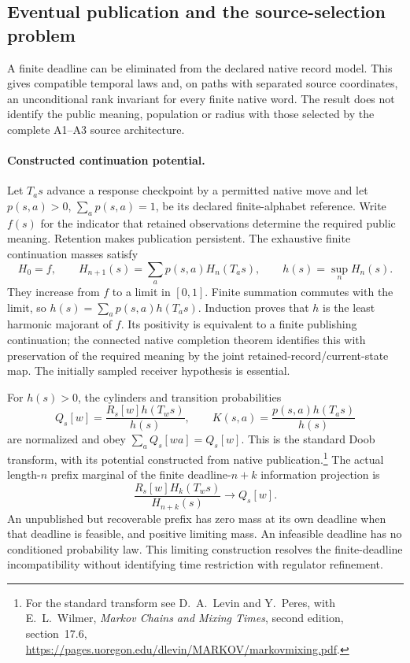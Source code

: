 \subsection{Eventual publication and the source-selection problem}
\label{sec:source-eventual-publication}

A finite deadline can be eliminated from the declared native record model.
This gives compatible temporal laws and, on paths with separated source
coordinates, an unconditional rank invariant for every finite native word.
The result does not identify the public meaning, population or radius with
those selected by the complete A1--A3 source architecture.

\paragraph{Constructed continuation potential.}
Let $T_a s$ advance a response checkpoint by a permitted native move and
let $p(s,a)>0$, $\sum_a p(s,a)=1$, be its declared finite-alphabet reference.
Write $f(s)$ for the indicator that retained observations determine the
required public meaning. Retention makes publication persistent. The
exhaustive finite continuation masses satisfy
\[
 H_0=f,\qquad H_{n+1}(s)=\sum_a p(s,a)H_n(T_a s),\qquad
 h(s)=\sup_n H_n(s).
\]
They increase from $f$ to a limit in $[0,1]$. Finite summation commutes
with the limit, so $h(s)=\sum_a p(s,a)h(T_a s)$. Induction proves that
$h$ is the least harmonic majorant of $f$. Its positivity is equivalent
to a finite publishing continuation; the connected native completion
theorem identifies this with preservation of the required meaning by
the joint retained-record/current-state map. The initially sampled
receiver hypothesis is essential.

For $h(s)>0$, the cylinders and transition probabilities
\[
 Q_s[w]=\frac{R_s[w]h(T_w s)}{h(s)},\qquad
 K(s,a)=\frac{p(s,a)h(T_a s)}{h(s)}
\]
are normalized and obey $\sum_a Q_s[wa]=Q_s[w]$. This is the standard
Doob transform, with its potential constructed from native publication.\footnote{
For the standard transform see D.~A.~Levin and Y.~Peres, with E.~L.~Wilmer,
\emph{Markov Chains and Mixing Times}, second edition, section~17.6,
\url{https://pages.uoregon.edu/dlevin/MARKOV/markovmixing.pdf}.}
The actual length-$n$ prefix marginal of the finite deadline-$n+k$
information projection is
\[
 \frac{R_s[w]H_k(T_w s)}{H_{n+k}(s)}\longrightarrow Q_s[w].
\]
An unpublished but recoverable prefix has zero mass at its own deadline
when that deadline is feasible, and positive limiting mass. An infeasible
deadline has no conditioned probability law. This limiting construction resolves the
finite-deadline incompatibility without identifying time restriction with
regulator refinement.

